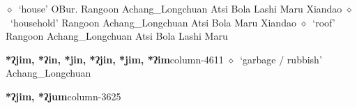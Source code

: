 \hspace{1ex}
         $\diamond$~`house'
         OBur. 
\hspace{1ex}
         Rangoon 
\hspace{1ex}
         Achang\_Longchuan 
\hspace{1ex}
         Atsi 
\hspace{1ex}
         Bola 
\hspace{1ex}
         Lashi 
\hspace{1ex}
         Maru 
\hspace{1ex}
         Xiandao 
\hspace{1ex}
         $\diamond$~`household'
         Rangoon 
\hspace{1ex}
         Achang\_Longchuan 
\hspace{1ex}
         Atsi 
\hspace{1ex}
         Bola 
\hspace{1ex}
         Maru 
\hspace{1ex}
         Xiandao 
\hspace{1ex}
         $\diamond$~`roof'
         Rangoon 
\hspace{1ex}
         Achang\_Longchuan 
\hspace{1ex}
         Atsi 
\hspace{1ex}
         Bola 
\hspace{1ex}
         Lashi 
\hspace{1ex}
         Maru 
  \item {\footnotesize \textbf{*ʔjim, *ʔin, *jin, *ʔjin, *jim, *ʔim}}{\tiny column-4611}
         $\diamond$~`garbage / rubbish'
         Achang\_Longchuan 
  \item {\footnotesize \textbf{*ʔjim, *ʔjum}}{\tiny column-3625}
